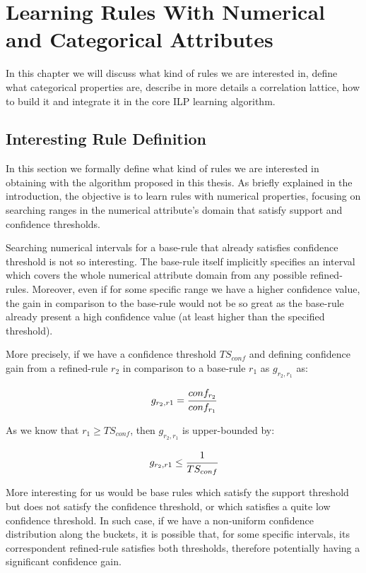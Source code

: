 \chapter{Learning Rules With Numerical and Categorical Attributes}
\label{cl:intro}

In this chapter we will discuss what kind of rules we are interested in, define what categorical properties are,
describe in more details a correlation lattice, how to build it and integrate it in the core ILP learning algorithm.

\section{Interesting Rule Definition}

In this section we formally define what kind of rules we are interested in obtaining with the algorithm proposed in
this thesis. As briefly explained in the introduction, the objective is to learn rules with numerical properties,
focusing on searching ranges in the numerical attribute's domain that satisfy support and confidence thresholds.

Searching numerical intervals for a base-rule that already satisfies confidence threshold is not so interesting. The
base-rule itself implicitly specifies an interval which covers the whole numerical attribute domain from any possible
refined-rules. Moreover, even if for some specific range we have a higher confidence value, the gain in comparison to
the base-rule would not be so great as the base-rule already present a high confidence value (at least higher than the
specified threshold).

More precisely, if we have a confidence threshold $TS_{conf}$ and defining confidence gain from a refined-rule
$r_2$ in comparison to a base-rule $r_1$ as $g_{r_2,r_1}$ as:

\begin{equation}
 g_{r_2,r1}=\cfrac{conf_{r_2}}{conf_{r_1}}
\end{equation}

As we know that $r_1 \geq TS_{conf}$, then $g_{r_2,r_1}$ is upper-bounded by:

\begin{equation}
 g_{r_2,r1} \leq \cfrac{1}{TS_{conf}}
\end{equation}

More interesting for us would be base rules which satisfy the support threshold but does not satisfy the confidence
threshold, or which satisfies a quite low confidence threshold. In such case, if we have a non-uniform confidence
distribution along the buckets, it is possible that, for some specific intervals, its correspondent refined-rule
satisfies both thresholds, therefore potentially having a significant confidence gain.

